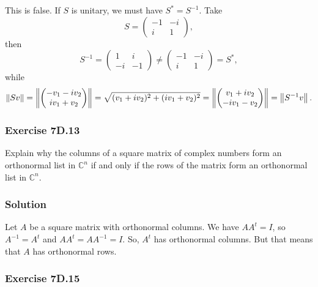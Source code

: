This is false.
If $S$ is unitary, we must have $S^* = S^{-1}$.
Take
\begin{equation*}
    S = \begin{pmatrix}
        -1 & -i \\
        i & 1
    \end{pmatrix},
\end{equation*}
then
\begin{equation*}
    S^{-1}
        = \begin{pmatrix}
            1 & i \\
            -i & -1
        \end{pmatrix}
        \neq \begin{pmatrix}
            -1 & -i \\
            i & 1
        \end{pmatrix}
        = S^*,
\end{equation*}
while
\begin{equation*}
    \left\lVert Sv\right\rVert
        = \left\lVert\begin{pmatrix}
            -v_1 - iv_2 \\
            iv_1 + v_2
        \end{pmatrix}\right\rVert
        = \sqrt{(v_1 + iv_2)^2 + (iv_1 + v_2)^2}
        = \left\lVert\begin{pmatrix}
            v_1 + iv_2 \\
            -iv_1 - v_2
        \end{pmatrix}\right\rVert
        = \left\lVert S^{-1}v\right\rVert.
\end{equation*}


\subsubsection*{Exercise 7D.13}

Explain why the columns of a square matrix of complex numbers form an orthonormal list in $\mathbb{C}^n$ if and only if the rows of the matrix form an orthonormal list in $\mathbb{C}^n$.

\subsubsection*{Solution}

Let $A$ be a square matrix with orthonormal columns.
We have $AA^t = I$, so $A^{-1} = A^t$ and $AA^t = AA^{-1} = I$.
So, $A^t$ has orthonormal columns.
But that means that $A$ has orthonormal rows.


\subsubsection*{Exercise 7D.15}


